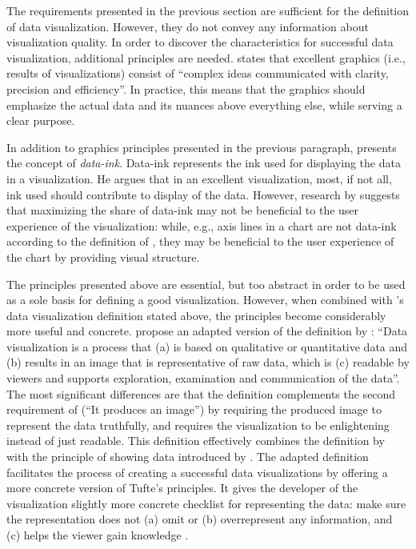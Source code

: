 The requirements presented in the previous section are sufficient for the definition of data visualization. However, they do not convey any information about visualization quality. In order to discover the characteristics for successful data visualization, additional principles are needed. \citet[p.~13]{tufte_visual_1986} states that excellent graphics (i.e., results of visualizations) consist of ``complex ideas communicated with clarity, precision and efficiency''. In practice, this means that the graphics should emphasize the actual data and its nuances above everything else, while serving a clear purpose.

In addition to graphics principles presented in the previous paragraph, \citet[p.~93]{tufte_visual_1986} presents the concept of \emph{data-ink}. Data-ink represents the ink used for displaying the data in a visualization. He argues that in an excellent visualization, most, if not all, ink used should contribute to display of the data. However, research by \citet{inbar_minimalism_2007} suggests that maximizing the share of data-ink may not be beneficial to the user experience of the visualization: while, e.g., axis lines in a chart are not data-ink according to the definition of \citeauthor{tufte_visual_1986}, they may be beneficial to the user experience of the chart by providing visual structure.

The principles presented above are essential, but too abstract in order to be used as a sole basis for defining a good visualization. However, when combined with \citeauthor{kosara_visualization_2007}'s data visualization definition stated above, the principles become considerably more useful and concrete. \citet{azzam_j-b_2013} propose an adapted version of the definition by \citet{kosara_visualization_2007}: ``Data visualization is a process that (a) is based on qualitative or quantitative data and (b) results in an image that is representative of raw data, which is (c) readable by viewers and supports exploration, examination and communication of the data''. The most significant differences are that the definition complements the second requirement of \citeauthor{kosara_visualization_2007} (``It produces an image'') by requiring the produced image to represent the data truthfully, and requires the visualization to be enlightening instead of just readable. This definition effectively combines the definition by \citet{kosara_visualization_2007} with the principle of showing data introduced by \citet{tufte_visual_1986}. The adapted definition facilitates the process of creating a successful data visualizations by offering a more concrete version of Tufte's principles. It gives the developer of the visualization slightly more concrete checklist for representing the data: make sure the representation does not (a) omit or (b) overrepresent any information, and (c) helps the viewer gain knowledge \citep{azzam_j-b_2013}.

